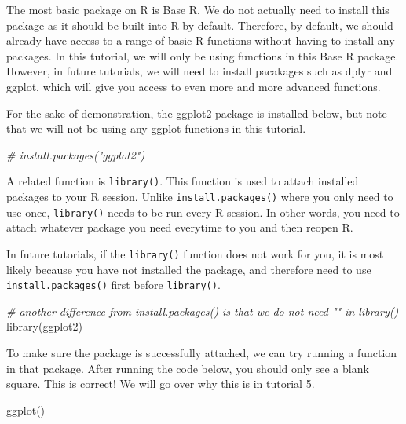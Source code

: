 \documentclass[
]{book}
\newenvironment{Shaded}{\begin{snugshade}}{\end{snugshade}}
\newcommand{\CommentTok}[1]{\textcolor[rgb]{0.56,0.35,0.01}{\textit{#1}}}
\newcommand{\FunctionTok}[1]{\textcolor[rgb]{0.00,0.00,0.00}{#1}}
\newcommand{\NormalTok}[1]{#1}
\begin{document}
The most basic package on R is Base R. We do not actually need to install this package as it should be built into R by default. Therefore, by default, we should already have access to a range of basic R functions without having to install any packages. In this tutorial, we will only be using functions in this Base R package. However, in future tutorials, we will need to install pacakages such as dplyr and ggplot, which will give you access to even more and more advanced functions.

For the sake of demonstration, the ggplot2 package is installed below, but note that we will not be using any ggplot functions in this tutorial.

\begin{Shaded}
\begin{Highlighting}[]
\CommentTok{\# install.packages("ggplot2")}
\end{Highlighting}
\end{Shaded}

A related function is \texttt{library()}. This function is used to attach installed packages to your R session. Unlike \texttt{install.packages()} where you only need to use once, \texttt{library()} needs to be run every R session. In other words, you need to attach whatever package you need everytime to you and then reopen R.

In future tutorials, if the \texttt{library()} function does not work for you, it is most likely because you have not installed the package, and therefore need to use \texttt{install.packages()} first before \texttt{library()}.

\begin{Shaded}
\begin{Highlighting}[]
\CommentTok{\# another difference from install.packages() is that we do not need "" in library()}
\FunctionTok{library}\NormalTok{(ggplot2)}
\end{Highlighting}
\end{Shaded}

To make sure the package is successfully attached, we can try running a function in that package. After running the code below, you should only see a blank square. This is correct! We will go over why this is in tutorial 5.

\begin{Shaded}
\begin{Highlighting}[]
\FunctionTok{ggplot}\NormalTok{()}
\end{Highlighting}
\end{Shaded}
\end{document}
